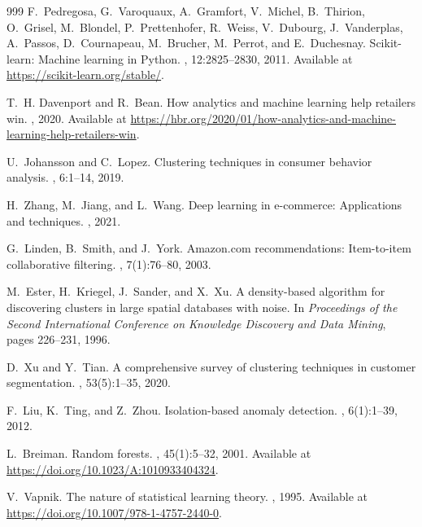 \documentclass[12pt, a4paper,twoside]{report}
\theoremstyle{plain} %
\theoremstyle{definition} %
\theoremstyle{remark} %
\numberwithin{equation}{chapter}
\begin{document}
\begin{thebibliography}{999}
F.~Pedregosa, G.~Varoquaux, A.~Gramfort, V.~Michel, B.~Thirion, O.~Grisel, M.~Blondel, P.~Prettenhofer, R.~Weiss, V.~Dubourg, J.~Vanderplas, A.~Passos, D.~Cournapeau, M.~Brucher, M.~Perrot, and E.~Duchesnay.
\newblock Scikit-learn: Machine learning in Python.
, 12:2825--2830, 2011.
\newblock Available at \url{https://scikit-learn.org/stable/}.

T.~H. Davenport and R.~Bean.
\newblock How analytics and machine learning help retailers win.
, 2020.
\newblock Available at \url{https://hbr.org/2020/01/how-analytics-and-machine-learning-help-retailers-win}.

U.~Johansson and C.~Lopez.
\newblock Clustering techniques in consumer behavior analysis.
, 6:1--14, 2019.

H.~Zhang, M.~Jiang, and L.~Wang.
\newblock Deep learning in e-commerce: Applications and techniques.
, 2021.

G.~Linden, B.~Smith, and J.~York.
\newblock Amazon.com recommendations: Item-to-item collaborative filtering.
, 7(1):76--80, 2003.

M.~Ester, H.~Kriegel, J.~Sander, and X.~Xu.
\newblock A density-based algorithm for discovering clusters in large spatial databases with noise.
\newblock In {\em Proceedings of the Second International Conference on Knowledge Discovery and Data Mining}, pages 226--231, 1996.

D.~Xu and Y.~Tian.
\newblock A comprehensive survey of clustering techniques in customer segmentation.
, 53(5):1--35, 2020.

F.~Liu, K.~Ting, and Z.~Zhou.
\newblock Isolation-based anomaly detection.
, 6(1):1--39, 2012.


L.~Breiman.
\newblock Random forests.
, 45(1):5--32, 2001.
\newblock Available at \url{https://doi.org/10.1023/A:1010933404324}.

V.~Vapnik.
\newblock The nature of statistical learning theory.
, 1995.
\newblock Available at \url{https://doi.org/10.1007/978-1-4757-2440-0}.


\end{thebibliography}
\end{document}
